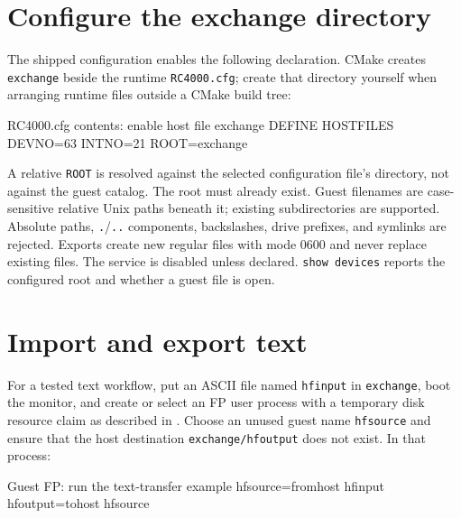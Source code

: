 \section{Configure the exchange directory}\label{configure-the-exchange-directory}

The shipped configuration enables the following declaration. CMake creates \passthrough{\lstinline!exchange!} beside the runtime \passthrough{\lstinline!RC4000.cfg!}; create that directory yourself when arranging runtime files outside a CMake build tree:

\begin{commandexample}{RC4000.cfg contents: enable host file exchange}
DEFINE HOSTFILES DEVNO=63 INTNO=21 ROOT=exchange
\end{commandexample}

A relative \passthrough{\lstinline!ROOT!} is resolved against the selected configuration file's directory, not against the guest catalog. The root must already exist. Guest filenames are case-sensitive relative Unix paths beneath it; existing subdirectories are supported. Absolute paths, \passthrough{\lstinline!.!}/\passthrough{\lstinline!..!} components, backslashes, drive prefixes, and symlinks are rejected. Exports create new regular files with mode 0600 and never replace existing files. The service is disabled unless declared. \passthrough{\lstinline!show devices!} reports the configured root and whether a guest file is open.

\section{Import and export text}\label{import-and-export-text}

For a tested text workflow, put an ASCII file named \passthrough{\lstinline!hfinput!} in \passthrough{\lstinline!exchange!}, boot the monitor, and create or select an FP user process with a temporary disk resource claim as described in . Choose an unused guest name \passthrough{\lstinline!hfsource!} and ensure that the host destination \passthrough{\lstinline!exchange/hfoutput!} does not exist. In that process:

\begin{commandexample}{Guest FP: run the text-transfer example}
hfsource=fromhost hfinput
hfoutput=tohost hfsource
\end{commandexample}

